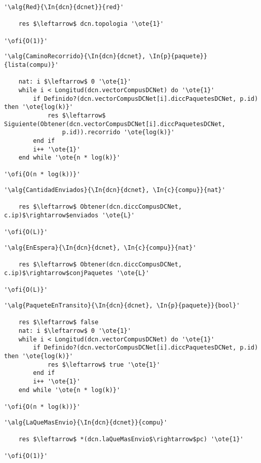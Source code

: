 \begin{lstlisting}[mathescape]
'\alg{Red}{\In{dcn}{dcnet}}{red}'
	
	res $\leftarrow$ dcn.topologia '\ote{1}'

'\ofi{O(1)}'
\end{lstlisting}

\begin{lstlisting}[mathescape]
'\alg{CaminoRecorrido}{\In{dcn}{dcnet}, \In{p}{paquete}}{lista(compu)}'
	
	nat: i $\leftarrow$ 0 '\ote{1}'
	while i < Longitud(dcn.vectorCompusDCNet) do '\ote{1}'
		if Definido?(dcn.vectorCompusDCNet[i].diccPaquetesDCNet, p.id) then '\ote{log(k)}'
			res $\leftarrow$ Siguiente(Obtener(dcn.vectorCompusDCNet[i].diccPaquetesDCNet, 
				p.id)).recorrido '\ote{log(k)}'
		end if
		i++ '\ote{1}'
	end while '\ote{n * log(k)}'

'\ofi{O(n * log(k))}'
\end{lstlisting}

\begin{lstlisting}[mathescape]
'\alg{CantidadEnviados}{\In{dcn}{dcnet}, \In{c}{compu}}{nat}'
	
	res $\leftarrow$ Obtener(dcn.diccCompusDCNet, c.ip)$\rightarrow$enviados '\ote{L}'

'\ofi{O(L)}'
\end{lstlisting}

\begin{lstlisting}[mathescape]
'\alg{EnEspera}{\In{dcn}{dcnet}, \In{c}{compu}}{nat}'
	
	res $\leftarrow$ Obtener(dcn.diccCompusDCNet, c.ip)$\rightarrow$conjPaquetes '\ote{L}'

'\ofi{O(L)}'
\end{lstlisting}

\begin{lstlisting}[mathescape]
'\alg{PaqueteEnTransito}{\In{dcn}{dcnet}, \In{p}{paquete}}{bool}'
	
	res $\leftarrow$ false
	nat: i $\leftarrow$ 0 '\ote{1}'
	while i < Longitud(dcn.vectorCompusDCNet) do '\ote{1}'
		if Definido?(dcn.vectorCompusDCNet[i].diccPaquetesDCNet, p.id) then '\ote{log(k)}'
			res $\leftarrow$ true '\ote{1}'
		end if
		i++ '\ote{1}'
	end while '\ote{n * log(k)}'

'\ofi{O(n * log(k))}'
\end{lstlisting}

\begin{lstlisting}[mathescape]
'\alg{LaQueMasEnvio}{\In{dcn}{dcnet}}{compu}'
	
	res $\leftarrow$ *(dcn.laQueMasEnvio$\rightarrow$pc) '\ote{1}'

'\ofi{O(1)}'
\end{lstlisting}

